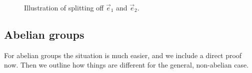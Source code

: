 \documentclass[a4paper, 12pt]{article}
\begin{document}
\begin{figure}
    \caption{Illustration of splitting off $\vec{e}_1$ and $\vec{e}_2$.}
    \label{fig:splittingOff}
\end{figure}



\subsection*{Abelian groups}
For abelian groups the situation is much easier, and we include a direct proof now. Then we outline how things are different for the general, non-abelian case.
\end{document}
